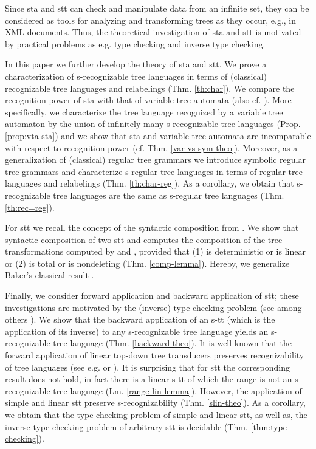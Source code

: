 \documentclass[10pt]{scrartcl}
\begin{document}
Since sta and stt can check and manipulate data from an infinite set, they can be considered as tools for analyzing and transforming trees as they occur, e.g., in XML documents. Thus, the theoretical investigation of sta and stt is motivated by practical problems as e.g. type checking and inverse type checking. 


In this paper we further develop the theory of sta and stt. We prove  a characterization of s-recognizable tree languages in terms of (classical) recognizable tree languages and relabelings (Thm. \ref{th:char}). We compare the recognition power of sta with that of variable tree automata  \cite{menrah11} (also cf.  \cite{grukupshe10}). More specifically, we characterize the tree language recognized by a variable tree automaton by the union of infinitely many s-recognizable tree languages  (Prop. \ref{prop:vta-sta}) and we show that sta and variable tree automata are incomparable  with respect to recognition power (cf. Thm. \ref{var-vs-sym-theo}).
Moreover, as a generalization of (classical) regular tree grammars \cite{bra69} we introduce symbolic regular tree grammars and characterize s-regular tree languages in terms of
regular tree languages and relabelings (Thm. \ref{th:char-reg}). As a corollary, we obtain that s-recognizable tree languages are the same as s-regular tree languages (Thm. \ref{th:rec=reg}).

 For stt we recall the concept of the syntactic composition from \cite{veabjo11b}. We show that  syntactic composition of two stt  and  computes the composition of the tree transformations computed by  and , provided that (1)  is deterministic or  is linear or (2)  is total or  is nondeleting (Thm. \ref{comp-lemma}). Hereby, we generalize Baker's classical result  \cite[Thm. 1]{bak79}. 

Finally, we consider forward application and backward application of stt; these investigations are motivated by the (inverse) type checking problem (see among others \cite{milsucvia03,alomilnevsucvia03,engman03,manberpersei05}). 
We show that the backward application of an s-tt (which is the application of its inverse) to any s-recognizable tree language yields an s-recognizable tree language (Thm. \ref{backward-theo}). It is well-known that the forward application of linear top-down tree transducers preserves recognizability of tree languages (see e.g. \cite{tha69} or \cite[Ch. IV, Cor. 6.6]{gecste84}). It is surprising that for stt the corresponding result does not hold, in fact there is a linear s-tt of which the range is not an s-recognizable tree language (Lm. \ref{range-lin-lemma}). However, the application of simple and linear stt preserve s-recognizability (Thm. \ref{slin-theo}).
As a corollary, we obtain that the type checking problem of simple and linear stt, as well as, the inverse type checking problem of arbitrary stt is decidable (Thm. \ref{thm:type-checking}).
\end{document}

